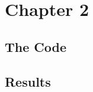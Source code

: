 %
\chapter{Chapter 2}\label{chap:2}
%
%
\section{The Code}\label{sec:code}
%
%
\section{Results}\label{sec:results}
%
